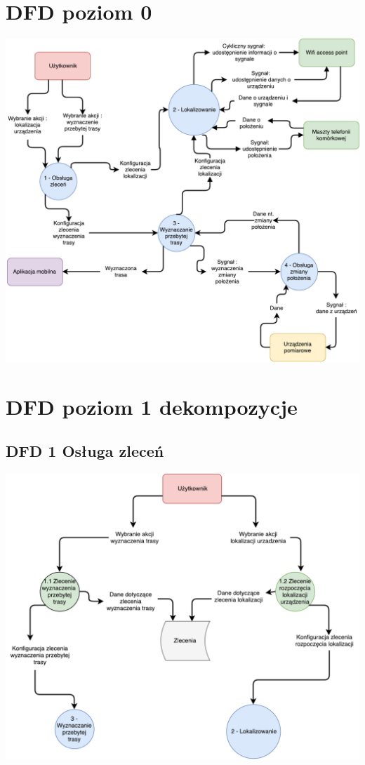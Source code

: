\documentclass[11pt]{article}
\begin{document}
	\section{DFD poziom 0}
	\begin{center}
		\includegraphics[scale=0.7]{DFD0.pdf}
	\end{center}
	\newpage
	\section{DFD poziom 1 dekompozycje}
	\subsection{DFD 1 Osługa zleceń}
	\begin{center}
		\includegraphics[scale=0.7]{DFD1.pdf}
	\end{center}
\end{document}
